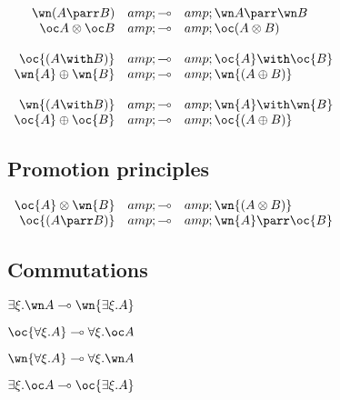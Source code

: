 \(\begin{array}{rcl}
  \wn(A\parr B) &amp;\limp&amp; \wn A\parr\wn B \\
  \oc A\tens\oc B &amp;\limp&amp; \oc(A\tens B) \\
\\
 \oc{(A \with B)} &amp;\limp&amp; \oc{A} \with \oc{B} \\
 \wn{A} \plus \wn{B} &amp;\limp&amp; \wn{(A \plus B)} \\
\\
 \wn{(A \with B)} &amp;\limp&amp; \wn{A} \with \wn{B} \\
 \oc{A} \plus \oc{B} &amp;\limp&amp; \oc{(A \plus B)}
\end{array}\)

\subsection{Promotion principles}\label{promotion-principles}

\(\begin{array}{rcl}
 \oc{A} \tens \wn{B} &amp;\limp&amp; \wn{(A \tens B)} \\
 \oc{(A \parr B)} &amp;\limp&amp; \wn{A} \parr \oc{B}
\end{array}\)

\subsection{Commutations}\label{commutations}

\(\exists \xi . \wn A \limp \wn{\exists \xi . A}\)

\(\oc{\forall \xi . A} \limp \forall \xi . \oc A\)

\(\wn{\forall \xi . A} \limp \forall \xi . \wn A\)

\(\exists \xi . \oc A \limp \oc{\exists \xi . A}\)


